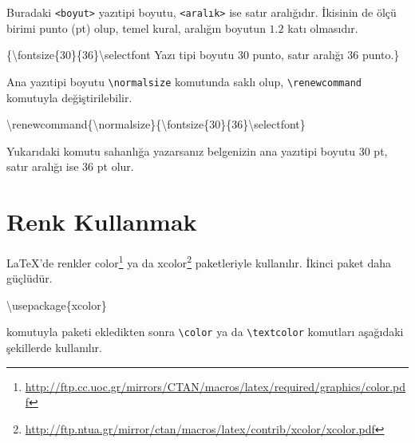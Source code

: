 \documentclass[
  10pt,
]{scrbook}
\newenvironment{Shaded}{\begin{snugshade}}{\end{snugshade}}
\newcommand{\BuiltInTok}[1]{#1}
\newcommand{\ExtensionTok}[1]{#1}
\newcommand{\FunctionTok}[1]{\textcolor[rgb]{0.00,0.00,0.00}{#1}}
\newcommand{\NormalTok}[1]{#1}
\renewcommand{\href}[2]{#2\footnote{\url{#1}}}
\theoremstyle{definition}
\theoremstyle{definition}
\theoremstyle{definition}
\theoremstyle{definition}
\theoremstyle{remark}
\begin{document}
Buradaki \texttt{\textless{}boyut\textgreater{}} yazıtipi boyutu, \texttt{\textless{}aralık\textgreater{}} ise satır aralığıdır. İkisinin de ölçü birimi punto (pt) olup, temel kural, aralığın boyutun \(1.2\) katı olmasıdır.

\begin{Shaded}
\begin{Highlighting}[]
\NormalTok{\{}\FunctionTok{\textbackslash{}fontsize}\NormalTok{\{30\}\{36\}}\FunctionTok{\textbackslash{}selectfont}
\NormalTok{Yazı tipi boyutu 30 punto,}
\NormalTok{satır aralığı 36 punto.\}}
\end{Highlighting}
\end{Shaded}

Ana yazıtipi boyutu \texttt{\textbackslash{}normalsize} komutunda saklı olup, \texttt{\textbackslash{}renewcommand} komutuyla değiştirilebilir.

\begin{Shaded}
\begin{Highlighting}[]
\FunctionTok{\textbackslash{}renewcommand}\NormalTok{\{}\ExtensionTok{\textbackslash{}normalsize}\NormalTok{\}\{}\FunctionTok{\textbackslash{}fontsize}\NormalTok{\{30\}\{36\}}\FunctionTok{\textbackslash{}selectfont}\NormalTok{\}}
\end{Highlighting}
\end{Shaded}

Yukarıdaki komutu sahanlığa yazarsanız belgenizin ana yazıtipi boyutu 30 pt, satır aralığı ise 36 pt olur.

\hypertarget{renk-kullanmak}{%
\section{Renk Kullanmak}\label{renk-kullanmak}}

LaTeX'de renkler \href{http://ftp.cc.uoc.gr/mirrors/CTAN/macros/latex/required/graphics/color.pdf}{color} ya da \href{http://ftp.ntua.gr/mirror/ctan/macros/latex/contrib/xcolor/xcolor.pdf}{xcolor} paketleriyle kullanılır. İkinci paket daha güçlüdür.

\begin{Shaded}
\begin{Highlighting}[]
\BuiltInTok{\textbackslash{}usepackage}\NormalTok{\{}\ExtensionTok{xcolor}\NormalTok{\}}
\end{Highlighting}
\end{Shaded}

komutuyla paketi ekledikten sonra \texttt{\textbackslash{}color} ya da \texttt{\textbackslash{}textcolor} komutları aşağıdaki şekillerde kullanılır.
\end{document}
